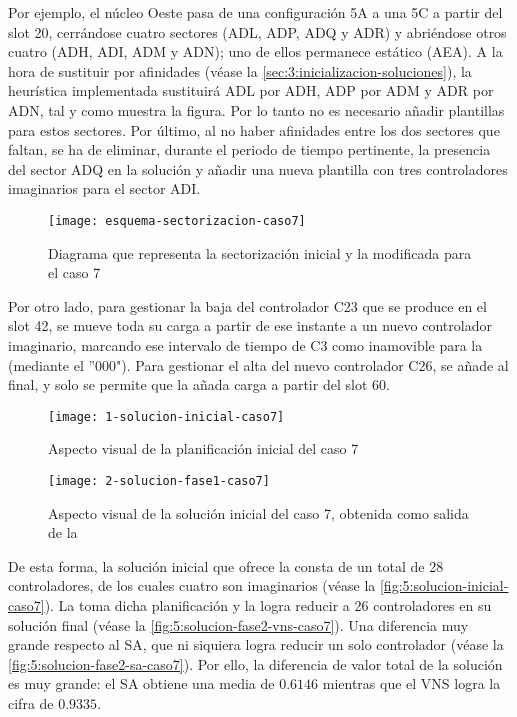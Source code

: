 Por ejemplo, el núcleo Oeste pasa de una configuración 5A a una 5C a partir del slot 20, cerrándose cuatro sectores (ADL, ADP, ADQ y ADR) y abriéndose otros cuatro (ADH, ADI, ADM y ADN); uno de ellos permanece estático (AEA). 
A la hora de sustituir por afinidades (véase la \autoref{sec:3:inicializacion-soluciones}), la heurística implementada sustituirá ADL por ADH, ADP por ADM y ADR por ADN, tal y como muestra la figura. Por lo tanto no es necesario añadir plantillas para estos sectores. Por último, al no haber afinidades entre los dos sectores que faltan, se ha de eliminar, durante el periodo de tiempo pertinente, la presencia del sector ADQ en la solución y añadir una nueva plantilla con tres controladores imaginarios para el sector ADI.

\begin{figure}
	\centering
	\texttt{[image: esquema-sectorizacion-caso7]}
	\caption{Diagrama que representa la sectorización inicial y la modificada para el caso 7}
	\label{fig:5:esquema-sectorizacion-caso7}
\end{figure}

Por otro lado, para gestionar la baja del controlador C23 que se produce en el slot 42, se mueve toda su carga a partir de ese instante a un nuevo controlador imaginario, marcando ese intervalo de tiempo de C3 como inamovible para la \fasedos{} (mediante el ''000").
Para gestionar el alta del nuevo controlador C26, se añade al final, y solo se permite que la \fasedos{} añada carga a partir del slot 60.

\begin{figure}[htbp]
	\centering
	\texttt{[image: 1-solucion-inicial-caso7]}
	\caption{Aspecto visual de la planificación inicial del caso 7}
	\label{fig:5:solucion-inicial-caso7}
\end{figure}

\begin{figure}[htbp]
	\centering
	\texttt{[image: 2-solucion-fase1-caso7]}
	\caption{Aspecto visual de la solución inicial del caso 7, obtenida como salida de la \faseuno{}}
	\label{fig:5:solucion-fase1-caso7}
\end{figure}

De esta forma, la solución inicial que ofrece la \faseuno{} consta de un total de 28 controladores, de los cuales cuatro son imaginarios (véase la \autoref{fig:5:solucion-inicial-caso7}). La \fasedos{} toma dicha planificación y la logra reducir a 26 controladores en su solución final (véase la \autoref{fig:5:solucion-fase2-vns-caso7}). Una diferencia muy grande respecto al SA, que ni siquiera logra reducir un solo controlador (véase la \autoref{fig:5:solucion-fase2-sa-caso7}). Por ello, la diferencia de valor total de la solución es muy grande: el SA obtiene una media de $0.6146$ mientras que el VNS logra la cifra de $0.9335$.

